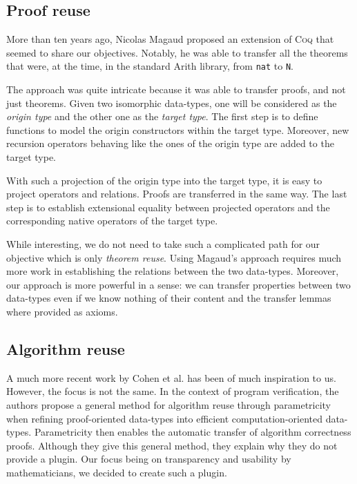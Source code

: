 \documentclass{llncs}
\begin{document}
\subsection{Proof reuse}

More than ten years ago, Nicolas Magaud \cite{Magaud2003} proposed
an extension of \textsc{Coq} that seemed to share our objectives.
Notably, he was able to transfer all the theorems that were,
at the time, in the standard Arith library, from \texttt{nat} to
\texttt{N}.

The approach was quite intricate because it was able to transfer
proofs, and not just theorems. Given two isomorphic data-types,
one will be considered as the \emph{origin type} and
the other one as the \emph{target type}.
The first step is to define functions to model the origin constructors
within the target type. Moreover, new recursion operators behaving like
the ones of the origin type are added to the target type.

With such a projection of the origin type into the target type, it is
easy to project operators and relations. Proofs are transferred in the
same way. The last step is to establish extensional equality between
projected operators and the corresponding native operators of the
target type.

While interesting, we do not need to take such a complicated path for
our objective which is only \emph{theorem reuse}. Using Magaud's approach
requires much more work in establishing the relations between the two
data-types. Moreover, our approach is more powerful in a sense: we can
transfer properties between two data-types even if we know nothing of
their content and the transfer lemmas where provided as axioms.

\subsection{Algorithm reuse}

A much more recent work by Cohen et al. \cite{Cohen2013} has been of much
inspiration to us. However, the focus is not the same.
In the context of program verification, the authors
propose a general method for algorithm reuse through
parametricity when refining proof-oriented data-types into efficient
computation-oriented data-types. Parametricity then enables the
automatic transfer of algorithm correctness proofs.
Although they give this general method, they explain why they do not
provide a plugin. Our focus being on transparency and usability by
mathematicians, we decided to create such a plugin.
\end{document}
